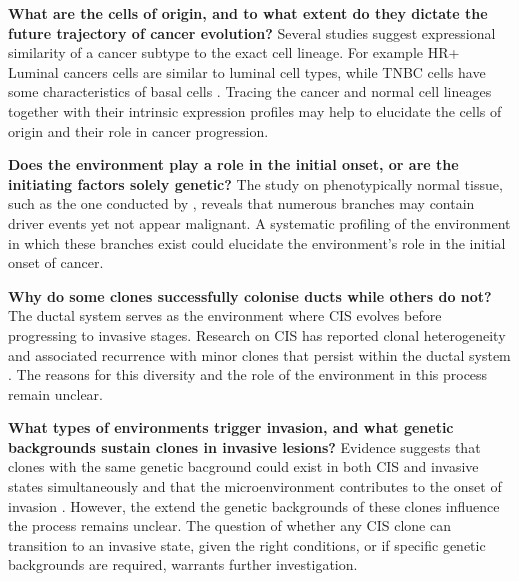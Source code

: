 \textbf{What are the cells of origin, and to what extent do they dictate the future trajectory of cancer evolution?} Several studies suggest expressional similarity of a cancer subtype to the exact cell lineage. For example HR+ Luminal cancers cells are similar to luminal cell types, while TNBC cells have some characteristics of basal cells \parencite{Skibinski2015-rh, Taurin2020-mq} . Tracing the cancer and normal cell lineages together with their intrinsic expression profiles may help to elucidate the cells of origin and their role in cancer progression.

\textbf{Does the environment play a role in the initial onset, or are the initiating factors solely genetic?} The study on phenotypically normal tissue, such as the one conducted by \textcite{Nishimura2023-mk}, reveals that numerous branches may contain driver events yet not appear malignant. A systematic profiling of the environment in which these branches exist could elucidate the environment's role in the initial onset of cancer.

\textbf{Why do some clones successfully colonise ducts while others do not?} The ductal system serves as the environment where \ac{CIS} evolves before progressing to invasive stages. Research on \ac{CIS} has reported clonal heterogeneity \parencite{Nishimura2023-mk, Yates2015-xk, Casasent2018-gx} and associated recurrence with minor clones that persist within the ductal system \parencite{Lips2022-kv}. The reasons for this diversity and the role of the environment in this process remain unclear.

\textbf{What types of environments trigger invasion, and what genetic backgrounds sustain clones in invasive lesions?} Evidence suggests that clones with the same genetic bacground could exist in both \ac{CIS} and invasive states simultaneously \parencite{Casasent2018-gx} and that the microenvironment contributes to the onset of invasion \parencite{Sinha2021-mf} . However, the extend the genetic backgrounds of these clones influence the process remains unclear. The question of whether any \ac{CIS} clone can transition to an invasive state, given the right conditions, or if specific genetic backgrounds are required, warrants further investigation.

